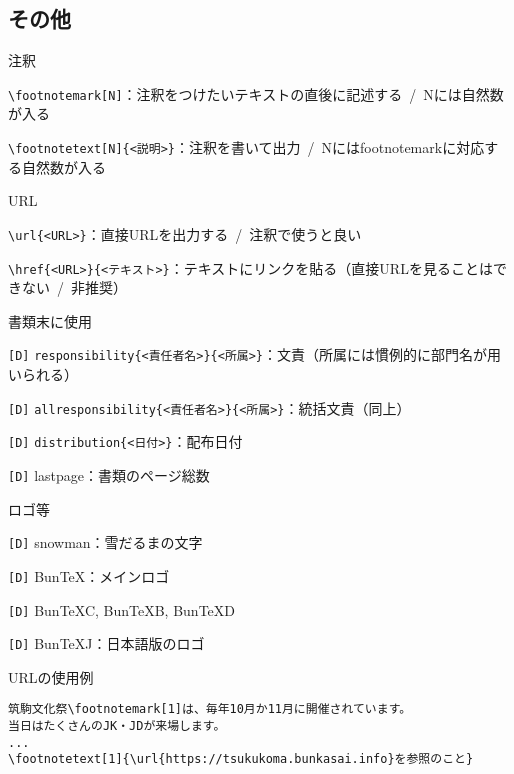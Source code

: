 \begin{multicols*}{2}
\section{その他}
\begin{framebox-simple}{注釈}
    \begin{reitemize}
        \item \verb|\footnotemark[N]|：注釈をつけたいテキストの直後に記述する~/~Nには自然数が入る
        \item \verb|\footnotetext[N]{<説明>}|：注釈を書いて出力~/~Nにはfootnotemarkに対応する自然数が入る
    \end{reitemize}
\end{framebox-simple}
\begin{framebox-simple}{URL}
    \begin{reitemize}
        \item \verb|\url{<URL>}|：直接URLを出力する~/~注釈で使うと良い
        \item \verb|\href{<URL>}{<テキスト>}|：テキストにリンクを貼る（直接URLを見ることはできない~/~非推奨）
    \end{reitemize}
\end{framebox-simple}
\begin{framebox-simple}{書類末に使用}
    \begin{reitemize}
        \item \verb|[D]| \verb|responsibility{<責任者名>}{<所属>}|：文責（所属には慣例的に部門名が用いられる）
        \item \verb|[D]| \verb|allresponsibility{<責任者名>}{<所属>}|：統括文責（同上）
        \item \verb|[D]| \verb|distribution{<日付>}|：配布日付
        \item \verb|[D]| lastpage：書類のページ総数
    \end{reitemize}
\end{framebox-simple}
\begin{framebox-simple}{ロゴ等}
    \begin{reitemize}
        \item \verb|[D]| snowman：雪だるまの文字
        \item \verb|[D]| BunTeX：メインロゴ
        \item \verb|[D]| BunTeXC, BunTeXB, BunTeXD
        \item \verb|[D]| BunTeXJ：日本語版のロゴ
    \end{reitemize}
\end{framebox-simple}
\begin{framebox-ref}{URLの使用例}
\begin{verbatim}
筑駒文化祭\footnotemark[1]は、毎年10月か11月に開催されています。
当日はたくさんのJK・JDが来場します。
...
\footnotetext[1]{\url{https://tsukukoma.bunkasai.info}を参照のこと}
\end{verbatim}
\end{framebox-ref}


\end{multicols*}
